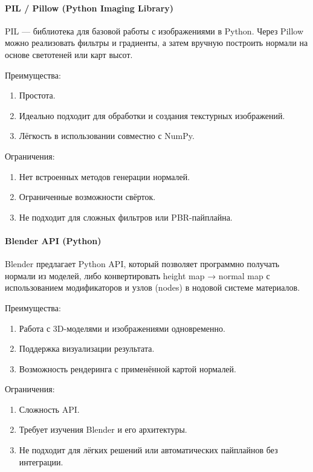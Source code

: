 \paragraph{PIL / Pillow (Python Imaging Library)}

PIL — библиотека для базовой работы с изображениями в Python. Через Pillow можно реализовать фильтры и градиенты, а затем вручную построить нормали на основе светотеней или карт высот.

Преимущества:
\begin{enumerate}
	\item Простота.
	\item Идеально подходит для обработки и создания текстурных изображений.
	\item Лёгкость в использовании совместно с NumPy.
\end{enumerate}

Ограничения:
\begin{enumerate}
	\item Нет встроенных методов генерации нормалей.
	\item Ограниченные возможности свёрток.
	\item Не подходит для сложных фильтров или PBR-пайплайна.
\end{enumerate}
\paragraph{Blender API (Python)}

Blender предлагает Python API, который позволяет программно получать нормали из моделей, либо конвертировать height map → normal map с использованием модификаторов и узлов (nodes) в нодовой системе материалов.

Преимущества:
\begin{enumerate}
	\item Работа с 3D-моделями и изображениями одновременно.
	\item Поддержка визуализации результата.
	\item Возможность рендеринга с применённой картой нормалей.
\end{enumerate}

Ограничения:
\begin{enumerate}
	\item Сложность API.
	\item Требует изучения Blender и его архитектуры.
	\item Не подходит для лёгких решений или автоматических пайплайнов без интеграции.
\end{enumerate}

